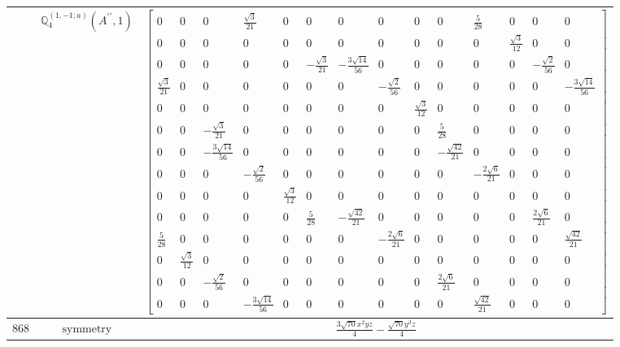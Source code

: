 \documentclass[fleqn,8pt,landscape]{jsarticle}
\begin{document}
\begin{longtable}{ccc}
$  $ & $ \mathbb{Q}_{4}^{(1,-1;a)}(A^{\prime\prime},1) $ & $ \begin{bmatrix} 0 & 0 & 0 & \frac{\sqrt{3}}{21} & 0 & 0 & 0 & 0 & 0 & 0 & \frac{5}{28} & 0 & 0 & 0 \\ 0 & 0 & 0 & 0 & 0 & 0 & 0 & 0 & 0 & 0 & 0 & \frac{\sqrt{3}}{12} & 0 & 0 \\ 0 & 0 & 0 & 0 & 0 & - \frac{\sqrt{3}}{21} & - \frac{3 \sqrt{14}}{56} & 0 & 0 & 0 & 0 & 0 & - \frac{\sqrt{2}}{56} & 0 \\ \frac{\sqrt{3}}{21} & 0 & 0 & 0 & 0 & 0 & 0 & - \frac{\sqrt{2}}{56} & 0 & 0 & 0 & 0 & 0 & - \frac{3 \sqrt{14}}{56} \\ 0 & 0 & 0 & 0 & 0 & 0 & 0 & 0 & \frac{\sqrt{3}}{12} & 0 & 0 & 0 & 0 & 0 \\ 0 & 0 & - \frac{\sqrt{3}}{21} & 0 & 0 & 0 & 0 & 0 & 0 & \frac{5}{28} & 0 & 0 & 0 & 0 \\ 0 & 0 & - \frac{3 \sqrt{14}}{56} & 0 & 0 & 0 & 0 & 0 & 0 & - \frac{\sqrt{42}}{21} & 0 & 0 & 0 & 0 \\ 0 & 0 & 0 & - \frac{\sqrt{2}}{56} & 0 & 0 & 0 & 0 & 0 & 0 & - \frac{2 \sqrt{6}}{21} & 0 & 0 & 0 \\ 0 & 0 & 0 & 0 & \frac{\sqrt{3}}{12} & 0 & 0 & 0 & 0 & 0 & 0 & 0 & 0 & 0 \\ 0 & 0 & 0 & 0 & 0 & \frac{5}{28} & - \frac{\sqrt{42}}{21} & 0 & 0 & 0 & 0 & 0 & \frac{2 \sqrt{6}}{21} & 0 \\ \frac{5}{28} & 0 & 0 & 0 & 0 & 0 & 0 & - \frac{2 \sqrt{6}}{21} & 0 & 0 & 0 & 0 & 0 & \frac{\sqrt{42}}{21} \\ 0 & \frac{\sqrt{3}}{12} & 0 & 0 & 0 & 0 & 0 & 0 & 0 & 0 & 0 & 0 & 0 & 0 \\ 0 & 0 & - \frac{\sqrt{2}}{56} & 0 & 0 & 0 & 0 & 0 & 0 & \frac{2 \sqrt{6}}{21} & 0 & 0 & 0 & 0 \\ 0 & 0 & 0 & - \frac{3 \sqrt{14}}{56} & 0 & 0 & 0 & 0 & 0 & 0 & \frac{\sqrt{42}}{21} & 0 & 0 & 0 \end{bmatrix} $ \\ \hline
$ 868 $ & $ \text{symmetry} $ & $ \frac{3 \sqrt{70} x^{2} y z}{4} - \frac{\sqrt{70} y^{3} z}{4} $ \\

\end{longtable}
\end{document}

